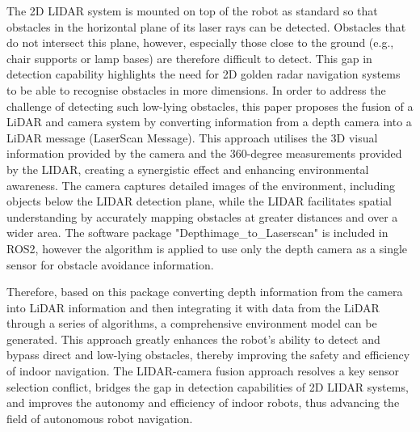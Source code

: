 The 2D LIDAR system is mounted on top of the robot as standard so that obstacles in the horizontal plane of its laser rays can be detected. Obstacles that do not intersect this plane, however, especially those close to the ground (e.g., chair supports or lamp bases) are therefore difficult to detect. This gap in detection capability highlights the need for 2D golden radar navigation systems to be able to recognise obstacles in more dimensions. In order to address the challenge of detecting such low-lying obstacles, this paper proposes the fusion of a LiDAR and camera system by converting information from a depth camera into a LiDAR message (LaserScan Message). 
This approach utilises the 3D visual information provided by the camera and the 360-degree measurements provided by the LIDAR, creating a synergistic effect and enhancing environmental awareness. The camera captures detailed images of the environment, including objects below the LIDAR detection plane, while the LIDAR facilitates spatial understanding by accurately mapping obstacles at greater distances and over a wider area.
The software package "Depthimage\_to\_Laserscan" is included in ROS2, however the algorithm is applied to use only the depth camera as a single sensor for obstacle avoidance information.

Therefore, based on this package converting depth information from the camera into LiDAR information and then integrating it with data from the LiDAR through a series of algorithms, a comprehensive environment model can be generated. This approach greatly enhances the robot's ability to detect and bypass direct and low-lying obstacles, thereby improving the safety and efficiency of indoor navigation.
The LIDAR-camera fusion approach resolves a key sensor selection conflict, bridges the gap in detection capabilities of 2D LIDAR systems, and improves the autonomy and efficiency of indoor robots, thus advancing the field of autonomous robot navigation.
